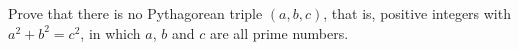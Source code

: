 Prove that there is no Pythagorean triple $(a,b,c)$, that is, positive integers with $a^2+b^2=c^2$, in which $a$, $b$ and $c$ are all prime numbers.
